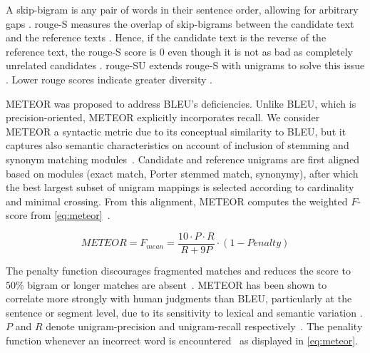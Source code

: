 A skip-bigram is any pair of words in their sentence order, allowing for arbitrary gaps \citep{lin_rouge_2004}.
\ac{rouge}-S measures the overlap of skip-bigrams between the candidate text and the reference texts \citep{lin_rouge_2004}.
Hence, if the candidate text is the reverse of the reference text, the \ac{rouge}-S score is 0 even though it is not as bad as completely unrelated candidates \citep{lin_rouge_2004}.
\ac{rouge}-SU extends \ac{rouge}-S with unigrams to solve this issue \citep{lin_rouge_2004}.
Lower \ac{rouge} scores indicate greater diversity \citep{kurt_pehlivanoglu_comparative_2024}.

METEOR was proposed to address BLEU's deficiencies. 
Unlike BLEU, which is precision-oriented, METEOR explicitly incorporates recall.
We consider METEOR a syntactic metric due to its conceptual similarity to BLEU, but it captures also semantic characteristics on account of inclusion of stemming and synonym matching modules~\citep{kurt_pehlivanoglu_comparative_2024}. 
Candidate and reference unigrams are first aligned based on modules (exact match, Porter stemmed match, synonymy), after which the best largest subset of unigram mappings is selected according to cardinality and minimal crossing. 
From this alignment, METEOR computes the weighted $F$-score from \autoref{eq:meteor}~\citep{banerjee_METEOR_2005}.

\begin{equation}
    METEOR = F_{mean} = \frac{10 \cdot P \cdot R}{R + 9P} \cdot (1 - Penalty)
\label{eq:meteor}
\end{equation}

The penalty function discourages fragmented matches and reduces the score to $50\%$ bigram or longer matches are absent~\citep{banerjee_METEOR_2005}. 
METEOR has been shown to correlate more strongly with human judgments than BLEU, particularly at the sentence or segment level, due to its sensitivity to lexical and semantic variation \citep{zhou_paraphrase_2021,kurt_pehlivanoglu_comparative_2024}.
$P$ and $R$ denote unigram-precision and unigram-recall respectively~\citep{kurt_pehlivanoglu_comparative_2024,banerjee_METEOR_2005}.
The penality function whenever an incorrect word is encountered~\citep{palivela_optimization_2021} as displayed in \autoref{eq:meteor}.


